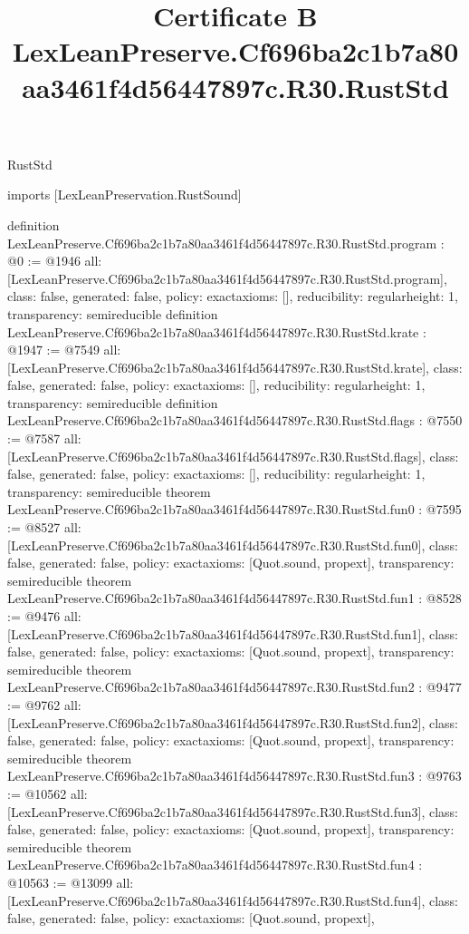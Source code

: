 \begin{lexlean}{RustStd}
\title{Certificate B LexLeanPreserve.Cf696ba2c1b7a80aa3461f4d56447897c.R30.RustStd}
\begin{coremodule}
imports [LexLeanPreservation.RustSound]

definition LexLeanPreserve.Cf696ba2c1b7a80aa3461f4d56447897c.R30.RustStd.program : @0 := @1946 {
  all: [LexLeanPreserve.Cf696ba2c1b7a80aa3461f4d56447897c.R30.RustStd.program],
  class: false,
  generated: false,
  policy: exact{axioms: []},
  reducibility: regular{height: 1},
  transparency: semireducible
}
definition LexLeanPreserve.Cf696ba2c1b7a80aa3461f4d56447897c.R30.RustStd.krate : @1947 := @7549 {
  all: [LexLeanPreserve.Cf696ba2c1b7a80aa3461f4d56447897c.R30.RustStd.krate],
  class: false,
  generated: false,
  policy: exact{axioms: []},
  reducibility: regular{height: 1},
  transparency: semireducible
}
definition LexLeanPreserve.Cf696ba2c1b7a80aa3461f4d56447897c.R30.RustStd.flags : @7550 := @7587 {
  all: [LexLeanPreserve.Cf696ba2c1b7a80aa3461f4d56447897c.R30.RustStd.flags],
  class: false,
  generated: false,
  policy: exact{axioms: []},
  reducibility: regular{height: 1},
  transparency: semireducible
}
theorem LexLeanPreserve.Cf696ba2c1b7a80aa3461f4d56447897c.R30.RustStd.fun0 : @7595 := @8527 {
  all: [LexLeanPreserve.Cf696ba2c1b7a80aa3461f4d56447897c.R30.RustStd.fun0],
  class: false,
  generated: false,
  policy: exact{axioms: [Quot.sound, propext]},
  transparency: semireducible
}
theorem LexLeanPreserve.Cf696ba2c1b7a80aa3461f4d56447897c.R30.RustStd.fun1 : @8528 := @9476 {
  all: [LexLeanPreserve.Cf696ba2c1b7a80aa3461f4d56447897c.R30.RustStd.fun1],
  class: false,
  generated: false,
  policy: exact{axioms: [Quot.sound, propext]},
  transparency: semireducible
}
theorem LexLeanPreserve.Cf696ba2c1b7a80aa3461f4d56447897c.R30.RustStd.fun2 : @9477 := @9762 {
  all: [LexLeanPreserve.Cf696ba2c1b7a80aa3461f4d56447897c.R30.RustStd.fun2],
  class: false,
  generated: false,
  policy: exact{axioms: [Quot.sound, propext]},
  transparency: semireducible
}
theorem LexLeanPreserve.Cf696ba2c1b7a80aa3461f4d56447897c.R30.RustStd.fun3 : @9763 := @10562 {
  all: [LexLeanPreserve.Cf696ba2c1b7a80aa3461f4d56447897c.R30.RustStd.fun3],
  class: false,
  generated: false,
  policy: exact{axioms: [Quot.sound, propext]},
  transparency: semireducible
}
theorem LexLeanPreserve.Cf696ba2c1b7a80aa3461f4d56447897c.R30.RustStd.fun4 : @10563 := @13099 {
  all: [LexLeanPreserve.Cf696ba2c1b7a80aa3461f4d56447897c.R30.RustStd.fun4],
  class: false,
  generated: false,
  policy: exact{axioms: [Quot.sound, propext]},
}
\end{coremodule}
\end{lexlean}
